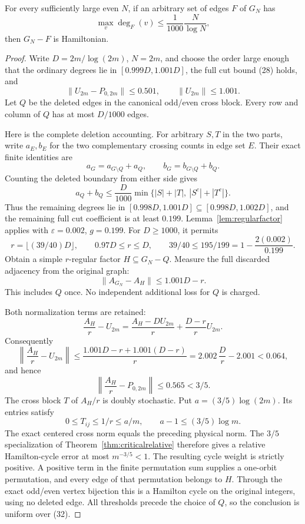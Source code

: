 \begin{theorem}
\label{thm:resilience}
For every sufficiently large even \(N\), if an arbitrary set
of edges \(F\) of \(G_N\) has
\[
 \max_v\deg_F(v)\leq \frac1{1000}\frac N{\log N},             \tag{32}
\]
then \(G_N-F\) is Hamiltonian.
\end{theorem}
\begin{proof}
Write \(D=2m/\log(2m)\), \(N=2m\), and choose the order
large enough that the ordinary degrees lie in
\([0.999D,1.001D]\), the full cut bound (28) holds, and
\[
 \|U_{2m}-P_{0,2m}\|\leq0.501,\qquad
 \|U_{2m}\|\leq1.001.
\]
Let \(Q\) be the deleted edges in the canonical odd/even
cross block. Every row and column of \(Q\) has at most
\(D/1000\) edges.

Here is the complete deletion accounting. For arbitrary
\(S,T\) in the two parts, write \(a_E,b_E\) for the two
complementary crossing counts in edge set \(E\).
Their exact finite identities are
\[
 a_G=a_{G\setminus Q}+a_Q,\qquad
 b_G=b_{G\setminus Q}+b_Q.
\]
Counting the deleted boundary from either side gives
\[
 a_Q+b_Q\leq\frac D{1000}
 \min\{|S|+|T|,\ |S^c|+|T^c|\}.
\]
Thus the remaining degrees lie in
\([0.998D,1.001D]\subseteq[0.998D,1.002D]\), and the
remaining full cut coefficient is at least \(0.199\).
Lemma~\ref{lem:regularfactor} applies with
\(\varepsilon=0.002\), \(g=0.199\).
For \(D\geq1000\), it permits
\[
 r=\lfloor(39/40)D\rfloor,\qquad 0.97D\leq r\leq D,
 \qquad 39/40\leq195/199=1-\frac{2(0.002)}{0.199}.
\]
Obtain a simple \(r\)-regular factor \(H\subseteq G_N-Q\).
Measure the full discarded adjacency from the original graph:
\[
 \|A_{G_N}-A_H\|\leq1.001D-r.
\]
This includes \(Q\) once. No independent additional loss
for \(Q\) is charged.

Both normalization terms are retained:
\[
 \frac{A_H}{r}-U_{2m}
 =\frac{A_H-DU_{2m}}r+\frac{D-r}rU_{2m}.
\]
Consequently
\[
 \left\|\frac{A_H}r-U_{2m}\right\|
 \leq \frac{1.001D-r+1.001(D-r)}r
 =2.002\,\frac Dr-2.001<0.064,
\]
and hence
\[
 \left\|\frac{A_H}r-P_{0,2m}\right\|
       \leq0.565<3/5.
\]
The cross block \(T\) of \(A_H/r\) is doubly stochastic.
Put \(a=(3/5)\log(2m)\). Its entries satisfy
\[
 0\leq T_{ij}\leq1/r\leq a/m,\qquad
 a-1\leq(3/5)\log m.
\]
The exact centered cross norm equals the preceding physical
norm. The \(3/5\) specialization of
Theorem~\ref{thm:criticalrelative} therefore gives a relative
Hamilton-cycle error at most \(m^{-3/5}<1\).
The resulting cycle weight is strictly positive.
A positive term in the finite permutation sum supplies a
one-orbit permutation, and every edge of that permutation
belongs to \(H\). Through the exact odd/even vertex
bijection this is a Hamilton cycle on the original integers,
using no deleted edge. All thresholds precede the choice of
\(Q\), so the conclusion is uniform over (32).
\end{proof}

